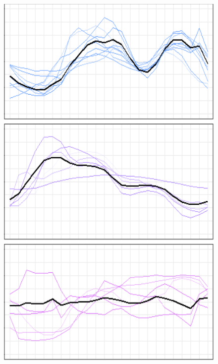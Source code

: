 \documentclass[
	11pt, %
	aspectratio=169, %
]{beamer}
\begin{document}
\begin{frame}
\begin{figure}
\begin{minipage}{0.16\textwidth}
			\includegraphics[width=\linewidth,keepaspectratio]{load_profile_5.png}
		\end{minipage}
		\begin{minipage}{0.16\textwidth}

\end{minipage}
\end{figure}
\end{frame}
\end{document}
